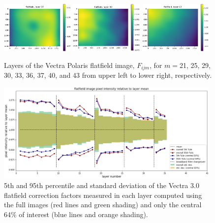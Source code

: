 \documentclass[letterpaper,11pt]{article}
\begin{document}
\begin{figure}[!ht]
\includegraphics[width=0.32\textwidth]{images/results/flatfield_layers_polaris/flatfield_layer_37}
\includegraphics[width=0.32\textwidth]{images/results/flatfield_layers_polaris/flatfield_layer_40}
\includegraphics[width=0.32\textwidth]{images/results/flatfield_layers_polaris/flatfield_layer_43}
\caption{\footnotesize Layers of the Vectra Polaris flatfield image, $F_{ijm}$, for $m=$21, 25, 29, 30, 33, 36, 37, 40, and 43 from upper left to lower right, respectively.}
\label{fig:flatfield_image_layers_polaris_2}
\end{figure}

\clearpage

\begin{figure}[!ht]
\centering
\includegraphics[width=0.98\textwidth]{images/results/flatfield_pixel_intensities_vectra}
\caption{\footnotesize 5th and 95th percentile and standard deviation of the Vectra 3.0 flatfield correction factors measured in each layer computed using the full images (red lines and green shading) and only the central 64\% of interest (blue lines and orange shading).}
\label{fig:flatfield_pixel_intensities_vectra}
\end{figure} 
\end{document}
